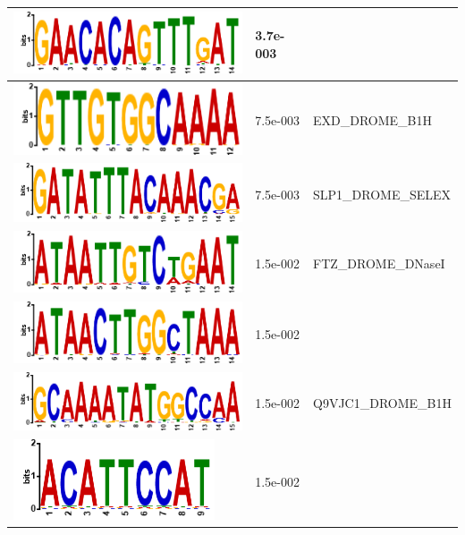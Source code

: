 \documentclass{article}
\begin{document}
{\begin{longtable}{|m{6.5cm}|m{1.5cm}|m{5cm}|}
	\hline
	\includegraphics[scale=0.5]{motif7.png} & 3.7e-003 & \\
	\hline
	\includegraphics[scale=0.5]{motif8.png} & 7.5e-003 & EXD\_DROME\_B1H\\
	\hline
	\includegraphics[scale=0.5]{motif9.png} & 7.5e-003 & SLP1\_DROME\_SELEX\\
	\hline
	\includegraphics[scale=0.5]{motif10.png} & 1.5e-002 & FTZ\_DROME\_DNaseI\\
	\hline
	\includegraphics[scale=0.5]{motif11.png} & 1.5e-002 & \\
	\hline
	\includegraphics[scale=0.5]{motif12.png} & 1.5e-002 & Q9VJC1\_DROME\_B1H \\
	\hline
	\includegraphics[scale=0.5]{motif13.png} & 1.5e-002 & \\

\end{longtable}}
\end{document}
